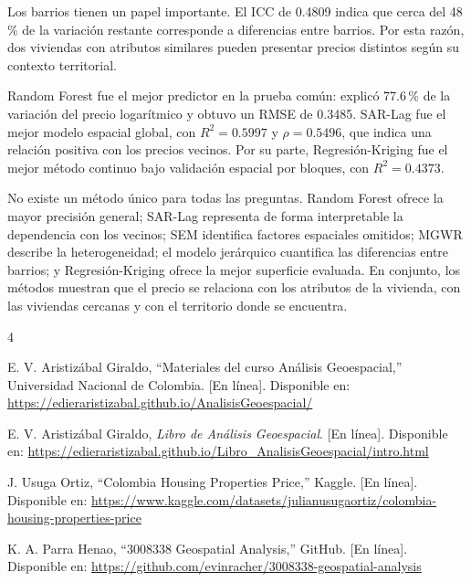 \documentclass[conference]{IEEEtran}
\begin{document}
Los barrios tienen un papel importante. El ICC de 0.4809 indica que cerca del 48\,\% de la variación restante corresponde a diferencias entre barrios. Por esta razón, dos viviendas con atributos similares pueden presentar precios distintos según su contexto territorial.

Random Forest fue el mejor predictor en la prueba común: explicó 77.6\,\% de la variación del precio logarítmico y obtuvo un RMSE de 0.3485. SAR-Lag fue el mejor modelo espacial global, con $R^2=0.5997$ y $\rho=0.5496$, que indica una relación positiva con los precios vecinos. Por su parte, Regresión-Kriging fue el mejor método continuo bajo validación espacial por bloques, con $R^2=0.4373$.

No existe un método único para todas las preguntas. Random Forest ofrece la mayor precisión general; SAR-Lag representa de forma interpretable la dependencia con los vecinos; SEM identifica factores espaciales omitidos; MGWR describe la heterogeneidad; el modelo jerárquico cuantifica las diferencias entre barrios; y Regresión-Kriging ofrece la mejor superficie evaluada. En conjunto, los métodos muestran que el precio se relaciona con los atributos de la vivienda, con las viviendas cercanas y con el territorio donde se encuentra.

\begin{thebibliography}{4}

E. V. Aristizábal Giraldo, ``Materiales del curso Análisis Geoespacial,'' Universidad Nacional de Colombia. [En línea]. Disponible en:
\url{https://edieraristizabal.github.io/AnalisisGeoespacial/}

E. V. Aristizábal Giraldo, \emph{Libro de Análisis Geoespacial}. [En línea]. Disponible en:
\url{https://edieraristizabal.github.io/Libro_AnalisisGeoespacial/intro.html}

J. Usuga Ortiz, ``Colombia Housing Properties Price,'' Kaggle. [En línea]. Disponible en:
\url{https://www.kaggle.com/datasets/julianusugaortiz/colombia-housing-properties-price}

K. A. Parra Henao, ``3008338 Geospatial Analysis,'' GitHub. [En línea]. Disponible en:
\url{https://github.com/evinracher/3008338-geospatial-analysis}

\end{thebibliography}
\end{document}
